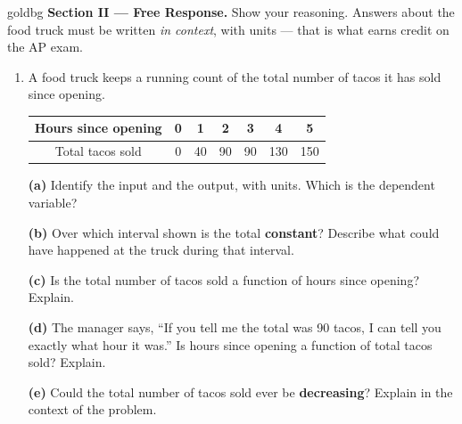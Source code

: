\documentclass[10pt]{article}
\begin{document}
\newpage

\begin{headlinebox}{goldbg}
\small
\textbf{Section II --- Free Response.} Show your reasoning. Answers about the food truck must be
written \emph{in context}, with units --- that is what earns credit on the AP exam.
\end{headlinebox}

\vspace{0.08in}

\begin{enumerate}[leftmargin=1.9em, itemsep=10pt, start=6]

\item A food truck keeps a running count of the total number of tacos it has sold since opening.

      \smallskip
      \begin{center}
      \renewcommand{\arraystretch}{1.35}
      \begin{tabular}{|c|c|c|c|c|c|c|}
      \hline
      Hours since opening & 0 & 1  & 2  & 3  & 4   & 5 \\ \hline
      Total tacos sold    & 0 & 40 & 90 & 90 & 130 & 150 \\ \hline
      \end{tabular}
      \end{center}

      \textbf{(a)} Identify the input and the output, with units. Which is the dependent variable?

      \textbf{(b)} Over which interval shown is the total \textbf{constant}? Describe what could
      have happened at the truck during that interval.

      \textbf{(c)} Is the total number of tacos sold a function of hours since opening? Explain.

      \textbf{(d)} The manager says, ``If you tell me the total was 90 tacos, I can tell you exactly
      what hour it was.'' Is hours since opening a function of total tacos sold? Explain.

      \textbf{(e)} Could the total number of tacos sold ever be \textbf{decreasing}? Explain in the
      context of the problem.

\end{enumerate}
\end{document}
